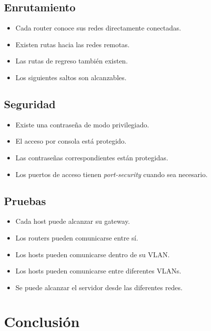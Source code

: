 \documentclass[12pt]{article}
\begin{document}
\subsection*{Enrutamiento}

\begin{itemize}
    \item[$\square$] Cada router conoce sus redes directamente conectadas.
    \item[$\square$] Existen rutas hacia las redes remotas.
    \item[$\square$] Las rutas de regreso también existen.
    \item[$\square$] Los siguientes saltos son alcanzables.
\end{itemize}

\subsection*{Seguridad}

\begin{itemize}
    \item[$\square$] Existe una contraseña de modo privilegiado.
    \item[$\square$] El acceso por consola está protegido.
    \item[$\square$] Las contraseñas correspondientes están protegidas.
    \item[$\square$] Los puertos de acceso tienen \textit{port-security} cuando
    sea necesario.
\end{itemize}

\subsection*{Pruebas}

\begin{itemize}
    \item[$\square$] Cada host puede alcanzar su gateway.
    \item[$\square$] Los routers pueden comunicarse entre sí.
    \item[$\square$] Los hosts pueden comunicarse dentro de su VLAN.
    \item[$\square$] Los hosts pueden comunicarse entre diferentes VLANs.
    \item[$\square$] Se puede alcanzar el servidor desde las diferentes redes.
\end{itemize}


\section{Conclusión}
\end{document}
